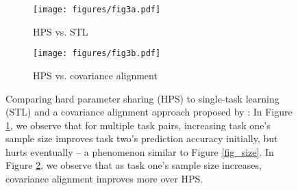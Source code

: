 \begin{figure}%
	\begin{subfigure}[t]{0.5\textwidth}
		\centering
		\vspace{0pt}
		\texttt{[image: figures/fig3a.pdf]}
		\caption{HPS vs. STL}
		\label{fig_ab_data}
	\end{subfigure}\hfill
	\begin{subfigure}[t]{0.5\textwidth}
		\centering
		\vspace{0pt}
		\texttt{[image: figures/fig3b.pdf]}
		\caption{HPS vs. covariance alignment}
		\label{fig_ab_cov}
	\end{subfigure}
	\caption{Comparing hard parameter sharing (HPS) to single-task learning (STL) and a covariance alignment approach proposed by \citet{WZR20}:
	In Figure \ref{fig_ab_data}, we observe that for multiple task pairs, increasing task one's sample size improves task two's prediction accuracy initially, but hurts eventually -- a phenomenon similar  to Figure \ref{fig_size}.
	In Figure \ref{fig_ab_cov}, we observe that as task one's sample size increases, covariance alignment improves more over HPS.}
	\label{fig_text}
\end{figure}

